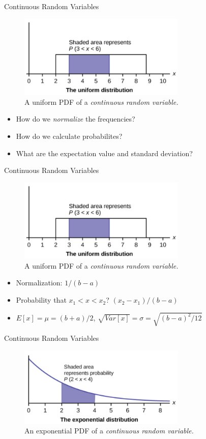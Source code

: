 \documentclass{beamer}
\begin{document}
\begin{frame}{Continuous Random Variables}
\begin{figure}
\centering
\includegraphics[width=8cm]{figures/uniform.png}
\caption{\label{fig:uniform} A uniform PDF of a \textit{continuous random variable.}}
\end{figure}
\begin{itemize}
\item How do we \textit{normalize} the frequencies?
\item How do we calculate probabilites?
\item What are the expectation value and standard deviation?
\end{itemize}
\end{frame}

\begin{frame}{Continuous Random Variables}
\begin{figure}
\centering
\includegraphics[width=8cm]{figures/uniform.png}
\caption{\label{fig:uniforma} A uniform PDF of a \textit{continuous random variable.}}
\end{figure}
\begin{itemize}
\item Normalization: $1/(b-a)$
\item Probability that $x_1 < x < x_2$? $(x_2 - x_1)/(b - a)$
\item $E[x] = \mu = (b+a)/2$, $\sqrt{Var[x]} = \sigma = \sqrt{(b-a)^2/12}$
\end{itemize}
\end{frame}

\begin{frame}{Continuous Random Variables}
\begin{figure}
\centering
\includegraphics[width=8cm]{figures/exp.png}
\caption{\label{fig:exp} An exponential PDF of a \textit{continuous random variable.}}
\end{figure}
\end{frame}
\end{document}
